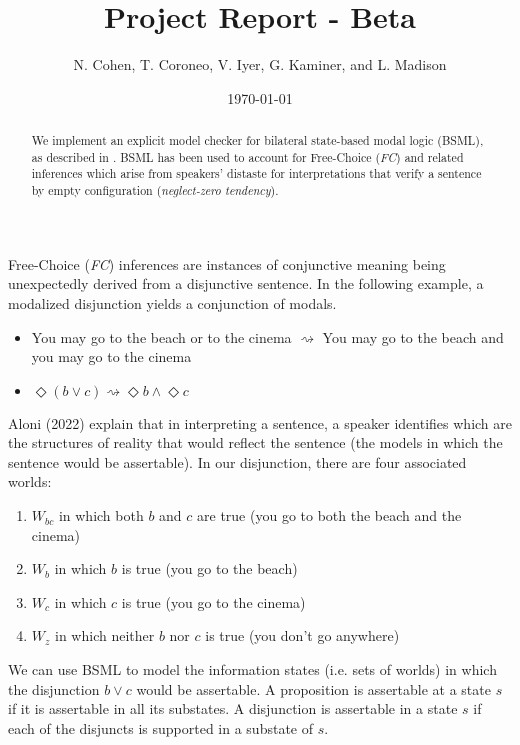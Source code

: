\documentclass[11pt,a4paper]{article}
\title{Project Report - Beta}
\author{N. Cohen, T. Coroneo, V. Iyer, G. Kaminer, and L. Madison}
\date{\today}
\begin{document}
\maketitle

\begin{abstract}
We implement an explicit model checker for bilateral state-based modal logic
(BSML), as described in \cite{Aloni2024}. BSML has been used to account for
Free-Choice (\textit{FC}) and related inferences which arise from speakers' distaste for
interpretations that verify a sentence by empty configuration  (\textit{neglect-zero tendency}).
\end{abstract}

Free-Choice (\textit{FC}) inferences are instances of conjunctive meaning being unexpectedly
derived from a disjunctive sentence. In the following example, a modalized disjunction yields
a conjunction of modals.

\begin{itemize}
\item You may go to the beach or to the cinema $\rightsquigarrow$ You may go to the beach
 and you may go to the cinema
\item $\Diamond(b\vee c)\rightsquigarrow\Diamond b \wedge \Diamond c$
\end{itemize}

Aloni (2022) explain that in interpreting a sentence, a speaker identifies which are the structures of
reality that would reflect the sentence (the models in which the sentence would be assertable).
In our disjunction, there are four associated worlds:

\begin{enumerate}
\item $W_{bc}$ in which both $b$ and $c$ are true (you go to both the beach and the cinema)
\item $W_b$ in which $b$ is true (you go to the beach)
\item $W_c$ in which $c$ is true (you go to the cinema)
\item $W_z$ in which neither $b$ nor $c$ is true (you don't go anywhere)
\end{enumerate}

We can use BSML to model the information states (i.e. sets of worlds) in which the disjunction $b\vee c$
would be assertable. A proposition is assertable at a state $s$ if it is assertable in all its substates.
A disjunction is assertable in a state $s$ if each of the disjuncts is supported in a substate of $s$.
\end{document}
